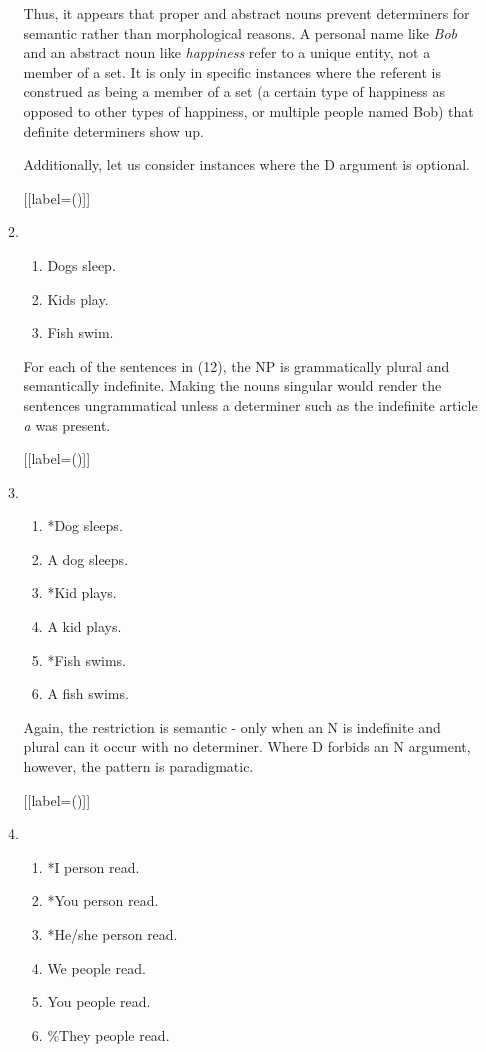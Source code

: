 \documentclass[12pt]{article}
\begin{document}
\begin{enumerate}[label=\textbf{\arabic*.}]
\begin{enumerate}[label=(\arabic*)]
Thus, it appears that proper and abstract nouns prevent determiners for semantic rather than morphological reasons. A personal name like \emph{Bob} and an abstract noun like \emph{happiness} refer to a unique entity, not a member of a set. It is only in specific instances where the referent is construed as being a member of a set (a certain type of happiness as opposed to other types of happiness, or multiple people named Bob) that definite determiners show up.


Additionally, let us consider instances where the D argument is optional.

[{[label=(\arabic*)]}]
\item
\begin{enumerate}[label=\alph*.]
\item Dogs sleep.
\item Kids play.
\item Fish swim.
\end{enumerate}

For each of the sentences in (12), the NP is grammatically plural and semantically indefinite. Making the nouns singular would render the sentences ungrammatical unless a determiner such as the indefinite article \emph{a} was present.

[{[label=(\arabic*)]}]
\item
\begin{enumerate}[label=\alph*.]
\item *Dog sleeps.
\item A dog sleeps.
\item *Kid plays.
\item A kid plays.
\item *Fish swims.
\item A fish swims.
\end{enumerate}

Again, the restriction is semantic - only when an N is indefinite and plural can it occur with no determiner. Where D forbids an N argument, however, the pattern is paradigmatic.

[{[label=(\arabic*)]}]
\item
\begin{enumerate}[label=\alph*.]
\item *I person read.
\item *You person read.
\item *He/she person read.
\item We people read.
\item You people read.
\item \%They people read.
\end{enumerate}


\end{enumerate}
\end{enumerate}
\end{document}

